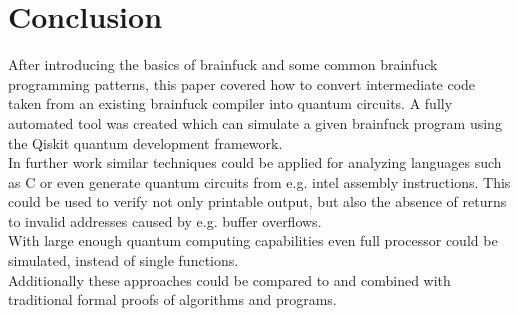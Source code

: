\documentclass[11pt, a4paper]{article}
\begin{document}



\section{Conclusion}
After introducing the basics of brainfuck and some common brainfuck programming patterns, this paper covered how to convert intermediate code taken from an existing brainfuck compiler into quantum circuits. A fully automated tool was created which can simulate a given brainfuck program using the Qiskit quantum development framework. \\
In further work similar techniques could be applied for analyzing languages such as C or even generate quantum circuits from e.g. intel assembly instructions. This could be used to verify not only printable output, but also the absence of returns to invalid addresses caused by e.g. buffer overflows. \\
With large enough quantum computing capabilities even full processor could be simulated, instead of single functions. \\
Additionally these approaches could be compared to and combined with traditional formal proofs of algorithms and programs.
\end{document}
